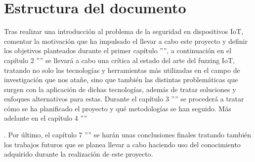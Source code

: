 \section{Estructura del documento}
Tras realizar una introducción al problema de la seguridad en dispositivos IoT, comentar la motivación que ha impulsado
el llevar a cabo este proyecto y definir los objetivos planteados durante el primer capítulo '''', a continuación en el capítulo 2
'''' se llevará a cabo una crítica al estado del arte del fuzzing IoT, tratando no solo las tecnologías y herramientas 
más utilizadas en el campo de investigación que nos atañe, sino que también las distintas problemáticas que surgen con 
la aplicación de dichas tecnologías, además de tratar soluciones y enfoques alternativos para estas.
Durante el capítulo 3 '''' se procederá a tratar cómo se ha planificado el proyecto y qué metodologías se han seguido. Más adelante en el 
capítulo 4 ''''


. Por último, el capítulo 7 '''' se harán unas 
conclusiones finales tratando también los trabajos futuros que se planea llevar a cabo haciendo uso del conocimiento 
adquirido durante la realización de este proyecto.